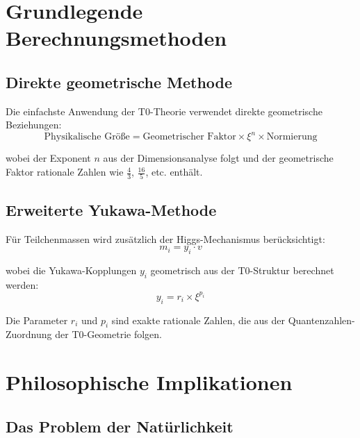 \documentclass[12pt,a4paper]{article}
\begin{document}
	\section{Grundlegende Berechnungsmethoden}
	
	\subsection{Direkte geometrische Methode}
	
	Die einfachste Anwendung der T0-Theorie verwendet direkte geometrische Beziehungen:
	\begin{equation}
		\text{Physikalische Größe} = \text{Geometrischer Faktor} \times \xi^n \times \text{Normierung}
		\label{eq:direct_method}
	\end{equation}
	
	wobei der Exponent $n$ aus der Dimensionsanalyse folgt und der geometrische Faktor rationale Zahlen wie $\frac{4}{3}$, $\frac{16}{5}$, etc. enthält.
	
	\subsection{Erweiterte Yukawa-Methode}
	
	Für Teilchenmassen wird zusätzlich der Higgs-Mechanismus berücksichtigt:
	\begin{equation}
		m_i = y_i \cdot v
		\label{eq:yukawa_method}
	\end{equation}
	
	wobei die Yukawa-Kopplungen $y_i$ geometrisch aus der T0-Struktur berechnet werden:
	\begin{equation}
		y_i = r_i \times \xi^{p_i}
		\label{eq:yukawa_coupling}
	\end{equation}
	
	Die Parameter $r_i$ und $p_i$ sind exakte rationale Zahlen, die aus der Quantenzahlen-Zuordnung der T0-Geometrie folgen.
	
	\section{Philosophische Implikationen}
	
	\subsection{Das Problem der Natürlichkeit}
	
\end{document}
